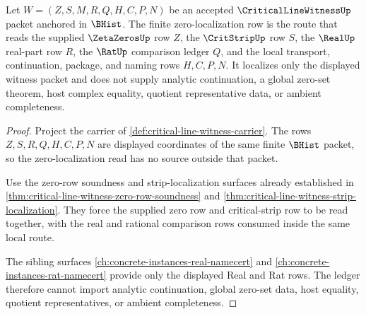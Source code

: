 \begin{theorem}
\label{thm:criticallinewitness-zero-localization-obligation}
Let $W=(Z,S,M,R,Q,H,C,P,N)$ be an accepted $\CriticalLineWitnessUp$ packet anchored in $\BHist$. The finite zero-localization row is the route that reads the supplied $\ZetaZerosUp$ row $Z$, the $\CritStripUp$ row $S$, the $\RealUp$ real-part row $R$, the $\RatUp$ comparison ledger $Q$, and the local transport, continuation, package, and naming rows $H,C,P,N$. It localizes only the displayed witness packet and does not supply analytic continuation, a global zero-set theorem, host complex equality, quotient representative data, or ambient completeness.
\end{theorem}
\begin{proof}
Project the carrier of \autoref{def:critical-line-witness-carrier}. The rows $Z,S,R,Q,H,C,P,N$ are displayed coordinates of the same finite $\BHist$ packet, so the zero-localization read has no source outside that packet.

Use the zero-row soundness and strip-localization surfaces already established in \autoref{thm:critical-line-witness-zero-row-soundness} and \autoref{thm:critical-line-witness-strip-localization}. They force the supplied zero row and critical-strip row to be read together, with the real and rational comparison rows consumed inside the same local route.

The sibling surfaces \autoref{ch:concrete-instances-real-namecert} and \autoref{ch:concrete-instances-rat-namecert} provide only the displayed Real and Rat rows. The ledger therefore cannot import analytic continuation, global zero-set data, host equality, quotient representatives, or ambient completeness.
\end{proof}

